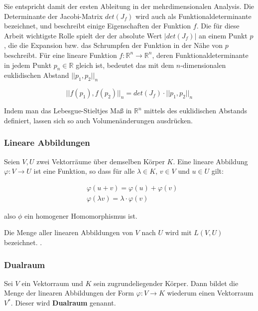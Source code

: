 \documentclass[a4paper,fontsize=12pt,toc=bib,halfparskip]{scrartcl}
\begin{document}
Sie entspricht damit der ersten Ableitung in der mehrdimensionalen Analysis. Die Determinante der Jacobi-Matrix $det(J_f)$ wird auch als Funktionaldeterminante bezeichnet, und beschreibt einige Eigenschaften der Funktion $f$. Die f\"ur diese Arbeit wichtigste Rolle spielt der der absolute Wert $|det(J_f)|$ an einem Punkt $p$, die die Expansion bzw. das Schrumpfen der Funktion in der N\"ahe von $p$ beschreibt. F\"ur eine lineare Funktion $f: \mathbb{R}^n\rightarrow \mathbb{R}^n$, deren Funktionaldeterminante in jedem Punkt $p_n \in \mathbb{R}$ gleich ist, bedeutet das mit dem $n$-dimensionalen euklidischen Abstand $||p_1, p_2||_n$

\begin{equation}
	||f(p_1), f(p_2)||_n = det(J_f)\cdot||p_1, p_2||_n
\end{equation}

Indem man das Lebesgue-Stieltjes Ma{\ss} in $\mathbb{R}^n$ mittels des euklidischen Abstands definiert, lassen sich so auch Volumen\"anderungen ausdr\"ucken.

\subsubsection{Lineare Abbildungen}
Seien $V,U$ zwei Vektorr\"aume \"uber demselben K\"orper $K$. Eine lineare Abbildung $\varphi: V \rightarrow U$ ist eine Funktion, so dass f\"ur alle $\lambda \in K$, $v \in V$ und $u \in U$ gilt\cite[S.~85]{bowen2008introduction}:

\begin{equation}
\begin{split}
	&\varphi(u+v) = \varphi(u) + \varphi(v)
	\\
	&\varphi(\lambda v) = \lambda \cdot \varphi(v) 
\end{split}
\end{equation}

also $\phi$ ein homogener Homomorphismus ist.

Die Menge aller linearen Abbildungen von $V$ nach $U$ wird mit $L(V,U)$ bezeichnet. \cite[S.~97]{bowen2008introduction}.

\subsubsection{Dualraum}
Sei $V$ ein Vektorraum und $K$ sein zugrundeliegender K\"orper. Dann bildet die Menge der linearen Abbildungen der Form $\varphi: V \rightarrow K$ wiederum einen Vektorraum $V^*$. Dieser wird \textbf{Dualraum} genannt\cite[S.~203]{bowen2008introduction}. 
\end{document}
